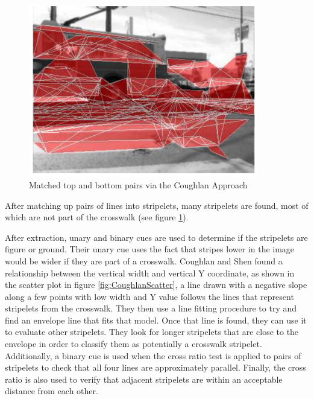 \begin{figure}[t]
\begin{center}
\includegraphics[width=10cm]{figures/CoughlanStriplets.png}
\captionfonts
\caption{Matched top and bottom pairs via the Coughlan Approach \cite{Coughlan2006}}
\label{fig:CoughlanStriplets}
\end{center}
\end{figure}

After matching up pairs of lines into stripelets, many stripelets are found, most of which are not part of the crosswalk (see figure \ref{fig:CoughlanStriplets}).

After extraction, unary and binary cues are used to determine if the stripelets are figure or ground. Their unary cue uses the fact that stripes lower in the image would be wider if they are part of a crosswalk. Coughlan and Shen found a relationship between the vertical width and vertical Y coordinate, as shown in the scatter plot in figure \ref{fig:CoughlanScatter}, a line drawn with a negative slope along a few points with low width and Y value follows the lines that represent stripelets from the crosswalk. They then use a line fitting procedure to try and find an envelope line that fits that model. Once that line is found, they can use it to evaluate other stripelets. They look for longer stripelets that are close to the envelope in order to classify them as potentially a crosswalk stripelet. Additionally, a binary cue is used when the cross ratio test is applied to pairs of stripelets to check that all four lines are approximately parallel. Finally, the cross ratio is also used to verify that adjacent stripelets are within an acceptable distance from each other. 

